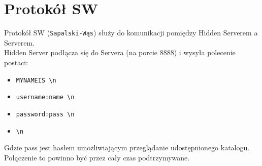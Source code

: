\documentclass[a4paper,notitlepage]{article}
\begin{document}
\pagestyle{fancy}
\tableofcontents
\section{Protokół SW}
Protokół SW (\texttt{Sapalski-Wąs}) służy do komunikacji pomiędzy Hidden Serverem a Serverem. \\
Hidden Server podłącza się do Servera (na porcie 8888) i wysyła polecenie postaci:
\begin{itemize}
    \item \texttt{MYNAMEIS \textbackslash n}
    \item \texttt{username:name \textbackslash n}
    \item \texttt{password:pass \textbackslash n}    
    \item \texttt{\textbackslash n}
\end{itemize}
Gdzie pass jest hasłem umożliwiającym przeglądanie udostępnionego katalogu.\\
Połączenie to powinno być przez cały czas podtrzymywane.\\
\end{document}
